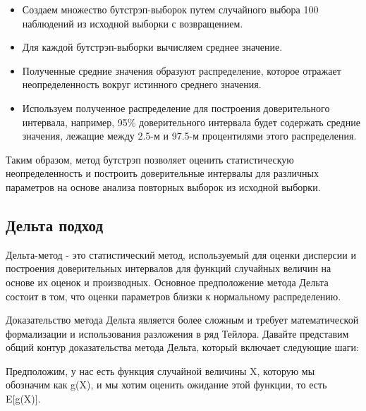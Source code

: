 \documentclass[specialist,
               substylefile = spbu_report.rtx,
               subf,href,colorlinks=true, 12pt]{disser}
\begin{document}
\begin{itemize}
    \item Создаем множество бутстрэп-выборок путем случайного выбора 100 наблюдений из исходной выборки с возвращением.
    \item Для каждой бутстрэп-выборки вычисляем среднее значение.
    \item Полученные средние значения образуют распределение, которое отражает неопределенность вокруг истинного среднего значения.
    \item Используем полученное распределение для построения доверительного интервала, например, 95\% доверительного интервала будет содержать средние значения, лежащие между 2.5-м и 97.5-м процентилями этого распределения.
\end{itemize}

Таким образом, метод бутстрэп позволяет оценить статистическую неопределенность и построить доверительные интервалы для различных параметров на основе анализа повторных выборок из исходной выборки.

\subsection{Дельта подход}

Дельта-метод - это статистический метод, используемый для оценки дисперсии и построения доверительных интервалов для функций случайных величин на основе их оценок и производных. Основное предположение метода Дельта состоит в том, что оценки параметров близки к нормальному распределению.


Доказательство метода Дельта является более сложным и требует математической формализации и использования разложения в ряд Тейлора. Давайте представим общий контур доказательства метода Дельта, который включает следующие шаги:

Предположим, у нас есть функция случайной величины X, которую мы обозначим как g(X), и мы хотим оценить ожидание этой функции, то есть E[g(X)].
\end{document}

